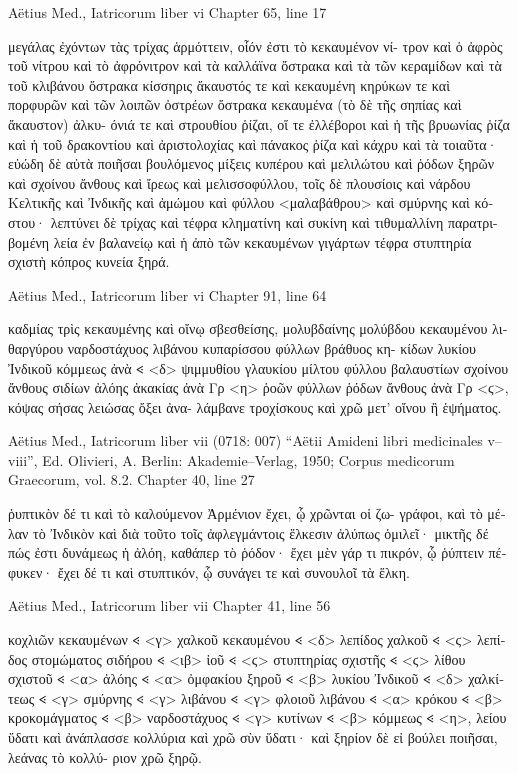 \documentclass[12pt,letterpaper,twoside,final]{memoir}
\begin{document}
\begin{greek}
Aëtius Med., Iatricorum liber vi 
Chapter 65, line 17

μεγάλας ἐχόντων τὰς τρίχας ἁρμόττειν, οἷόν ἐστι τὸ κεκαυμένον νί-
τρον καὶ ὁ ἀφρὸς τοῦ νίτρου καὶ τὸ ἀφρόνιτρον καὶ τὰ καλλάϊνα 
ὄστρακα καὶ τὰ τῶν κεραμίδων καὶ τὰ τοῦ κλιβάνου ὄστρακα κίσσηρις 
ἄκαυστός τε καὶ κεκαυμένη κηρύκων τε καὶ πορφυρῶν καὶ τῶν λοιπῶν 
ὀστρέων ὄστρακα κεκαυμένα (τὸ δὲ τῆς σηπίας καὶ ἄκαυστον) ἀλκυ-
όνιά τε καὶ στρουθίου ῥίζαι, οἵ τε ἐλλέβοροι καὶ ἡ τῆς βρυωνίας ῥίζα 
καὶ ἡ τοῦ δρακοντίου καὶ ἀριστολοχίας καὶ πάνακος ῥίζα καὶ κάχρυ 
καὶ τὰ τοιαῦτα· εὐώδη δὲ αὐτὰ ποιῆσαι βουλόμενος μίξεις κυπέρου 
καὶ μελιλώτου καὶ ῥόδων ξηρῶν καὶ σχοίνου ἄνθους καὶ ἴρεως καὶ 
μελισσοφύλλου, τοῖς δὲ πλουσίοις καὶ νάρδου Κελτικῆς καὶ Ἰνδικῆς καὶ 
ἀμώμου καὶ φύλλου <μαλαβάθρου> καὶ σμύρνης καὶ κόστου· λεπτύνει 
δὲ τρίχας καὶ τέφρα κληματίνη καὶ συκίνη καὶ τιθυμαλλίνη παρατρι-
βομένη λεία ἐν βαλανείῳ καὶ ἡ ἀπὸ τῶν κεκαυμένων γιγάρτων τέφρα 
στυπτηρία σχιστὴ κόπρος κυνεία ξηρά. 



Aëtius Med., Iatricorum liber vi 
Chapter 91, line 64

                                                                    καδμίας τρὶς 
κεκαυμένης καὶ οἴνῳ σβεσθείσης, μολυβδαίνης μολύβδου κεκαυμένου 
λιθαργύρου ναρδοστάχυος λιβάνου κυπαρίσσου φύλλων βράθυος κη-
κίδων λυκίου Ἰνδικοῦ κόμμεως ἀνὰ 𐅻 <δ> ψιμμυθίου γλαυκίου μίλτου 
φύλλου βαλαυστίων σχοίνου ἄνθους σιδίων ἀλόης ἀκακίας ἀνὰ Γρ <η> 
ῥοῶν φύλλων ῥόδων ἄνθους ἀνὰ Γρ <ϛ>, κόψας σήσας λειώσας ὄξει ἀνα-
λάμβανε τροχίσκους καὶ χρῶ μετ' οἴνου ἢ ἑψήματος. 



Aëtius Med., Iatricorum liber vii (0718: 007)
“Aëtii Amideni libri medicinales v–viii”, Ed. Olivieri, A.
Berlin: Akademie–Verlag, 1950; Corpus medicorum Graecorum, vol. 8.2.
Chapter 40, line 27

ῥυπτικὸν δέ τι καὶ τὸ καλούμενον Ἀρμένιον ἔχει, ᾧ χρῶνται οἱ ζω-
γράφοι, καὶ τὸ μέλαν τὸ Ἰνδικὸν καὶ διὰ τοῦτο τοῖς ἀφλεγμάντοις 
ἕλκεσιν ἀλύπως ὁμιλεῖ· μικτῆς δέ πώς ἐστι δυνάμεως ἡ ἀλόη, καθάπερ 
τὸ ῥόδον· ἔχει μὲν γάρ τι πικρόν, ᾧ ῥύπτειν πέφυκεν· ἔχει δέ τι καὶ 
στυπτικόν, ᾧ συνάγει τε καὶ συνουλοῖ τὰ ἕλκη. 



Aëtius Med., Iatricorum liber vii 
Chapter 41, line 56

                            κοχλιῶν κεκαυμένων 𐅻 <γ> χαλκοῦ κεκαυμένου 
𐅻 <δ> λεπίδος χαλκοῦ 𐅻 <ϛ> λεπίδος στομώματος σιδήρου 𐅻 <ιβ> ἰοῦ 𐅻 <ϛ> 
στυπτηρίας σχιστῆς 𐅻 <ϛ> λίθου σχιστοῦ 𐅻 <α> ἀλόης 𐅻 <α> ὀμφακίου ξηροῦ 
𐅻 <β> λυκίου Ἰνδικοῦ 𐅻 <δ> χαλκίτεως 𐅻 <γ> σμύρνης 𐅻 <γ> λιβάνου 𐅻 <γ>   
φλοιοῦ λιβάνου 𐅻 <α> κρόκου 𐅻 <β> κροκομάγματος 𐅻 <β> ναρδοστάχυος 
𐅻 <γ> κυτίνων 𐅻 <β> κόμμεως 𐅻 <η>, λείου ὕδατι καὶ ἀνάπλασσε κολλύρια 
καὶ χρῶ σὺν ὕδατι· καὶ ξηρίον δὲ εἰ βούλει ποιῆσαι, λεάνας τὸ κολλύ-
ριον χρῶ ξηρῷ. 




\end{greek}
\end{document}
